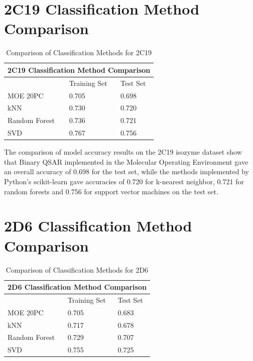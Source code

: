 \section{2C19 Classification Method Comparison}

\begin{table}[!htbp]
\begin{tabular}{|l|l|l|}
\hline
\multicolumn{3}{|c|}{2C19 Classification Method Comparison} \\ \hline
          & Training Set & Test Set \\ \hline
MOE 20PC  & 0.705        & 0.698    \\ \hline
kNN       & 0.730        & 0.720    \\ \hline
Random Forest & 0.736    & 0.721    \\ \hline
SVD       & 0.767        & 0.756    \\ \hline
\end{tabular}
\caption{Comparison of Classification Methods for 2C19}
\end{table}

The comparison of model accuracy results on the 2C19 isozyme dataset show that Binary QSAR implemented in the Molecular Operating Environment gave an overall accuracy of 0.698 for the test set, while the methods implemented by Python's scikit-learn gave accuracies of 0.720 for k-nearest neighbor, 0.721 for random forests and 0.756 for support vector machines on the test set.

\section{2D6 Classification Method Comparison}

\begin{table}[!htbp]
\begin{tabular}{|l|l|l|}
\hline
\multicolumn{3}{|c|}{2D6 Classification Method Comparison} \\ \hline
          & Training Set & Test Set \\ \hline
MOE 20PC  & 0.705        & 0.683    \\ \hline
kNN       & 0.717        & 0.678    \\ \hline
Random Forest & 0.729    & 0.707    \\ \hline
SVD       & 0.755        & 0.725    \\ \hline
\end{tabular}
\caption{Comparison of Classification Methods for 2D6}
\end{table}

